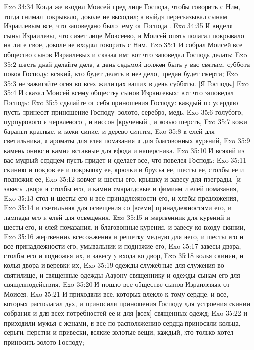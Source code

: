 \vs Exo 34:34 Когда же входил Моисей пред лице Господа, чтобы говорить с Ним, тогда снимал покрывало, доколе не выходил; а выйдя пересказывал сынам Израилевым все, что заповедано было [ему от Господа].
\vs Exo 34:35 И видели сыны Израилевы, что сияет лице Моисеево, и Моисей опять полагал покрывало на лице свое, доколе не входил говорить с Ним.
\vs Exo 35:1 И собрал Моисей все общество сынов Израилевых и сказал им: вот что заповедал Господь делать:
\vs Exo 35:2 шесть дней делайте дела, а день седьмой должен быть у вас святым, суббота покоя Господу: всякий, кто будет делать в нее дело, предан будет смерти;
\vs Exo 35:3 не зажигайте огня во всех жилищах ваших в день субботы. [Я Господь.]
\vs Exo 35:4 И сказал Моисей всему обществу сынов Израилевых: вот что заповедал Господь:
\vs Exo 35:5 сделайте от себя приношения Господу: каждый по усердию пусть принесет приношение Господу, золото, серебро, медь,
\vs Exo 35:6  голубого, пурпурового и червленого , и виссон [крученый], и козью шерсть,
\vs Exo 35:7 кожи бараньи красные, и кожи синие, и дерево ситтим,
\vs Exo 35:8 и елей для светильника, и ароматы для елея помазания и для благовонных курений,
\vs Exo 35:9 камень оникс и камни вставные для ефода и наперсника.
\vs Exo 35:10 И всякий из вас мудрый сердцем пусть придет и сделает все, что повелел Господь:
\vs Exo 35:11 скинию и покров ее и  покрышку ее, крючки и брусья ее, шесты ее, столбы ее и подножия ее,
\vs Exo 35:12 ковчег и шесты его, крышку и завесу для преграды, [и завесы двора и столбы его, и камни смарагдовые и фимиам и елей помазания,]
\vs Exo 35:13 стол и шесты его и все принадлежности его, и хлебы предложения,
\vs Exo 35:14 и светильник для освещения со [всеми] принадлежностями его, и лампады его и елей для освещения,
\vs Exo 35:15 и жертвенник для курений и шесты его, и елей помазания, и благовонные курения, и завесу ко входу скинии,
\vs Exo 35:16 жертвенник всесожжения и решетку медную для него, и шесты его и все принадлежности его, умывальник и подножие его,
\vs Exo 35:17 завесы двора, столбы его и подножия их, и завесу у входа во двор,
\vs Exo 35:18 колья скинии, и колья двора и веревки их,
\vs Exo 35:19 одежды служебные для служения во святилище, и священные одежды Аарону священнику и одежды сынам его для священнодействия.
\rsbpar\vs Exo 35:20 И пошло все общество сынов Израилевых от Моисея.
\vs Exo 35:21 И приходили все, которых влекло к тому сердце, и все, которых располагал дух, и приносили приношения Господу для устроения скинии собрания и для всех потребностей ее и для [всех] священных одежд;
\vs Exo 35:22 и приходили мужья с женами, и все по расположению сердца приносили кольца, серьги, перстни и привески, всякие золотые вещи, каждый, кто только хотел приносить золото Господу;
